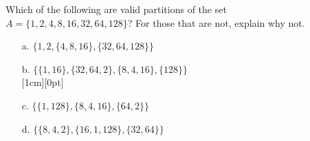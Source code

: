 \documentclass[a4paper,12pt]{book}
\newcounter{question}
\begin{document}
        \begin{questionNOGRADE}{\thequestion}

            Which of the following are valid partitions of the set
            $A = \{1, 2, 4, 8, 16, 32, 64, 128 \}$? For those that
            are not, explain why not.

            \begin{enumerate}
                \item[a.]   $\{ 1, 2, \{4, 8, 16\}, \{32, 64, 128\} \}$

                \item[b.]   $\{ \{1, 16\}, \{32, 64, 2\}, \{8, 4, 16\}, \{ 128 \} \}$
                     { ~\\ \raisebox{0pt}[1cm][0pt]{  } }

                \item[c.]   $\{ \{1, 128\}, \{8, 4, 16\}, \{64, 2\} \}$

                \item[d.]   $\{ \{8, 4, 2\}, \{16, 1, 128\}, \{32, 64\} \}$
            \end{enumerate}

        \end{questionNOGRADE}

    \newpage
\end{document}
